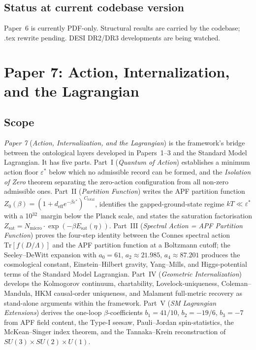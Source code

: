 \documentclass[11pt]{article}
\newcommand{\paperref}[2]{\emph{Paper #1} (\emph{#2})}
\begin{document}
\subsection{Status at current codebase version}\label{sec:P6_status}

Paper~6 is currently PDF-only. Structural results are carried by the codebase; .tex rewrite pending. DESI DR2/DR3 developments are being watched.

\clearpage

\section{Paper 7: Action, Internalization, and the Lagrangian}\label{sec:P7}

\subsection{Scope}\label{sec:P7_scope}

\paperref{7}{Action, Internalization, and the Lagrangian} is the framework's bridge between the ontological layers developed in Papers~1--3 and the Standard Model Lagrangian. It has five parts. Part~I (\emph{Quantum of Action}) establishes a minimum action floor $\varepsilon^*$ below which no admissible record can be formed, and the \emph{Isolation of Zero} theorem separating the zero-action configuration from all non-zero admissible ones. Part~II (\emph{Partition Function}) writes the APF partition function $Z_0(\beta) = (1 + d_{\mathrm{eff}} e^{-\beta \varepsilon^*})^{C_{\mathrm{total}}}$, identifies the gapped-ground-state regime $kT \ll \varepsilon^*$ with a 10$^{32}$~margin below the Planck scale, and states the saturation factorisation $Z_{\mathrm{sat}} = N_{\mathrm{micro}} \cdot \exp(-\beta E_{\mathrm{sat}}(\eta))$. Part~III (\emph{Spectral Action = APF Partition Function}) proves the four-step identity between the Connes spectral action $\mathrm{Tr}[f(D/\Lambda)]$ and the APF partition function at a Boltzmann cutoff; the Seeley--DeWitt expansion with $a_0 = 61$, $a_2 \approx 21.985$, $a_4 \approx 87.201$ produces the cosmological constant, Einstein--Hilbert gravity, Yang--Mills, and Higgs-potential terms of the Standard Model Lagrangian. Part~IV (\emph{Geometric Internalization}) develops the Kolmogorov continuum, chartability, Lovelock-uniqueness, Coleman--Mandula, HKM causal-order uniqueness, and Malament full-metric recovery as stand-alone arguments within the framework. Part~V (\emph{SM Lagrangian Extensions}) derives the one-loop $\beta$-coefficients $b_1 = 41/10$, $b_2 = -19/6$, $b_3 = -7$ from APF field content, the Type-I seesaw, Pauli--Jordan spin-statistics, the McKean--Singer index theorem, and the Tannaka--Krein reconstruction of $SU(3) \times SU(2) \times U(1)$.
\end{document}
